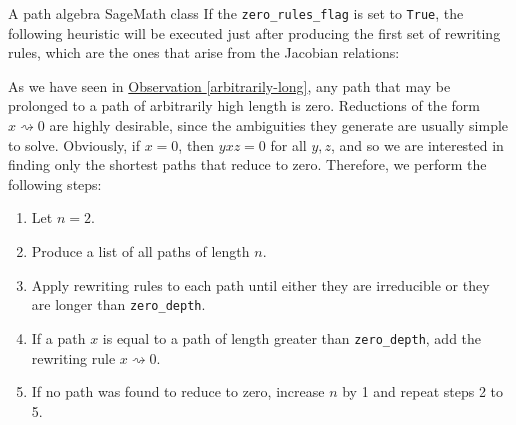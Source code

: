 \begin{chapter}{A path algebra SageMath class}
If the \texttt{zero\_rules\_flag} is set to \texttt{True}, the following heuristic will be executed just after producing the first set of rewriting rules, which are the ones that arise from the Jacobian relations:
\begin{heur} As we have seen in \hyperref[arbitrarily-long]{Observation \ref*{arbitrarily-long}},  any path that may be prolonged to a path of arbitrarily high length is zero. Reductions of the form $x\rightsquigarrow 0$ are highly desirable, since the ambiguities they generate are usually simple to solve. Obviously, if $x=0$, then $yxz=0$ for all $y,z$, and so we are interested in finding only the shortest paths that reduce to zero. Therefore, we perform the following steps:
\begin{enumerate}
\item Let $n=2$.
\item Produce a list of all paths of length $n$.
\item Apply rewriting rules to each path until either they are irreducible or they are longer than \texttt{zero\_depth}.
\item If a path $x$ is equal to a path of length greater than \texttt{zero\_depth}, add the rewriting rule $x\rightsquigarrow 0$.
\item If no path was found to reduce to zero, increase $n$ by 1 and repeat steps 2 to 5.
\end{enumerate}
\end{heur}


\end{chapter}
